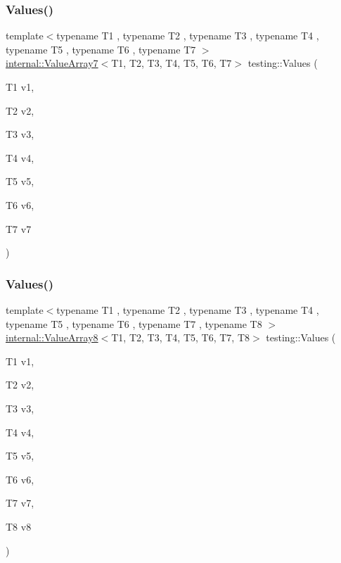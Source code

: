 \subsubsection{\texorpdfstring{Values()}{Values()}\hspace{0.1cm}{\footnotesize\ttfamily [7/50]}}
{\footnotesize\ttfamily template$<$typename T1 , typename T2 , typename T3 , typename T4 , typename T5 , typename T6 , typename T7 $>$ \\
\mbox{\hyperlink{classtesting_1_1internal_1_1ValueArray7}{internal\+::\+Value\+Array7}}$<$T1, T2, T3, T4, T5, T6, T7$>$ testing\+::\+Values (\begin{DoxyParamCaption}\item[{T1}]{v1,  }\item[{T2}]{v2,  }\item[{T3}]{v3,  }\item[{T4}]{v4,  }\item[{T5}]{v5,  }\item[{T6}]{v6,  }\item[{T7}]{v7 }\end{DoxyParamCaption})}

\mbox{\label{namespacetesting_a1eda12e6518e4c51c1bb2e7cc9d31ffa}} 
\subsubsection{\texorpdfstring{Values()}{Values()}\hspace{0.1cm}{\footnotesize\ttfamily [8/50]}}
{\footnotesize\ttfamily template$<$typename T1 , typename T2 , typename T3 , typename T4 , typename T5 , typename T6 , typename T7 , typename T8 $>$ \\
\mbox{\hyperlink{classtesting_1_1internal_1_1ValueArray8}{internal\+::\+Value\+Array8}}$<$T1, T2, T3, T4, T5, T6, T7, T8$>$ testing\+::\+Values (\begin{DoxyParamCaption}\item[{T1}]{v1,  }\item[{T2}]{v2,  }\item[{T3}]{v3,  }\item[{T4}]{v4,  }\item[{T5}]{v5,  }\item[{T6}]{v6,  }\item[{T7}]{v7,  }\item[{T8}]{v8 }\end{DoxyParamCaption})}

